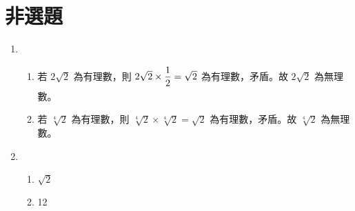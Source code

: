 \documentclass[12pt]{article}
\newcommand*{\fraction}[2]{\rule[-.8\baselineskip]{0pt}{2\baselineskip}\dfrac{#1}{#2}}
\begin{document}
\section*{非選題}
\begin{enumerate}[align=left,leftmargin=*,labelsep=.6em,parsep=0ex]
  \item
  \begin{enumerate}[label=(\arabic*),align=left,leftmargin=*,labelsep=.4em]
    \item 若 $2\sqrt{2}$ 為有理數，則 $2\sqrt{2} \times \fraction{1}{2} = \sqrt{2}$ 為有理數，矛盾。故 $2\sqrt{2}$ 為無理數。
    \item 若 $\sqrt[4]{2}$ 為有理數，則 $\sqrt[4]{2} \times \sqrt[4]{2} = \sqrt{2}$ 為有理數，矛盾。故 $\sqrt[4]{2}$ 為無理數。
  \end{enumerate}
  \item
  \begin{enumerate}[label=(\arabic*),align=left,leftmargin=*,labelsep=.4em]
    \item $\sqrt{2}$
    \item 12
  \end{enumerate}
\end{enumerate}
\end{document}
